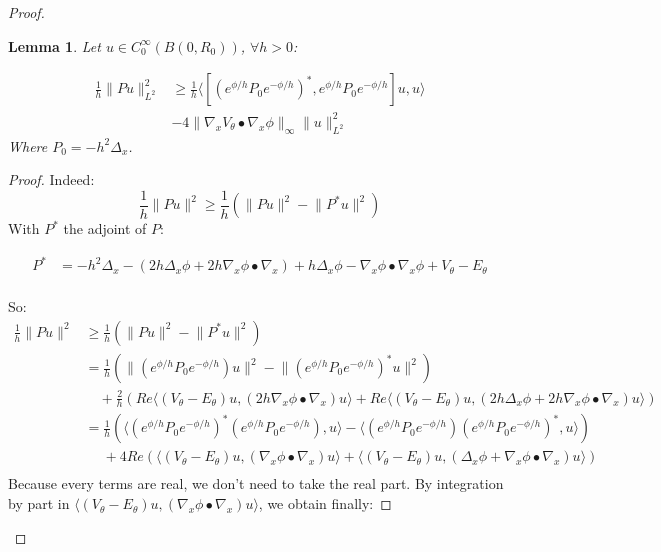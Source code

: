 \documentclass[leqno,11pt,letterpaper, english]{amsart}
\newcommand{\nn}{\nonumber}
\theoremstyle{plain}
\newtheorem{lem}[prop]{Lemma}
\theoremstyle{definition}
\numberwithin{equation}{section}
\begin{document}
\begin{proof}
\begin{lem}
\label{lemme: Ineg de separation avec V}
Let $u\in C_0^\infty (B(0,R_0))$, $\forall h>0$:

\begin{align}
    \frac{1}{h} \lVert Pu\rVert_{L^2}^2 &\geq \frac{1}{h}\langle\left[ (e^{\phi/h}P_0e^{-\phi/h})^\ast  , e^{\phi/h}P_0e^{-\phi/h}  \right]u,u\rangle\nn\\
    &-4\lVert \nabla_x V_\theta \bullet \nabla_x\phi \rVert_\infty \lVert u\rVert_{L^2}^2    
\end{align}
Where $P_0=-h^2\Delta_x$.
\end{lem}

\begin{proof}
Indeed:
\begin{equation}
	 \frac{1}{h} \lVert Pu\rVert^2 \geq \frac{1}{h} (\lVert Pu\rVert^2 -\lVert P^\ast  u\rVert^2)
\end{equation}
With $P^\ast $ the adjoint of $P$: 

\begin{align}
	P^\ast  &= -h^2\Delta_x -(2h \Delta_x \phi +2h\nabla_x \phi \bullet \nabla_x) +h\Delta_x \phi - \nabla_x \phi \bullet \nabla_x \phi +V_{\theta}-E_{\theta} \nn\\
\end{align}

So:
\begin{align}
    \frac{1}{h} \lVert Pu\rVert^2 &\geq \frac{1}{h} (\lVert Pu\rVert^2 -\lVert P^\ast  u\rVert^2) \nn\\
    &=\frac{1}{h} (\lVert (e^{\phi/h} P_0e^{-\phi/h}) u\rVert^2  -\lVert (e^{\phi/h} P_0e^{-\phi/h})^* u\rVert^2) \nn\\
    &\quad + \frac{2}{h}(  Re\langle(V_{\theta}-E_{\theta})u,(2h\nabla_x \phi \bullet \nabla_x)u\rangle  + Re\langle(V_{\theta}-E_{\theta})u, (2h \Delta_x \phi +2h\nabla_x \phi \bullet \nabla_x)u\rangle) \nn\\
    &=\frac{1}{h}(\langle (e^{\phi/h} P_0e^{-\phi/h})^* (e^{\phi/h} P_0e^{-\phi/h}) ,u\rangle -\langle (e^{\phi/h} P_0e^{-\phi/h}) (e^{\phi/h} P_0e^{-\phi/h})^* ,u\rangle ) \nn\\
    &\quad\; + 4Re(  \langle(V_{\theta}-E_{\theta})u,(\nabla_x \phi \bullet \nabla_x)u\rangle  + \langle(V_{\theta}-E_{\theta})u, ( \Delta_x \phi +\nabla_x \phi \bullet \nabla_x)u\rangle) \nn\\
\end{align}
Because every terms are real, we don't need to take the real part. By integration by part in $\langle(V_{\theta}-E_{\theta})u,(\nabla_x \phi \bullet \nabla_x)u\rangle$, we obtain finally:
 

\end{proof}
\end{proof}
\end{document}
